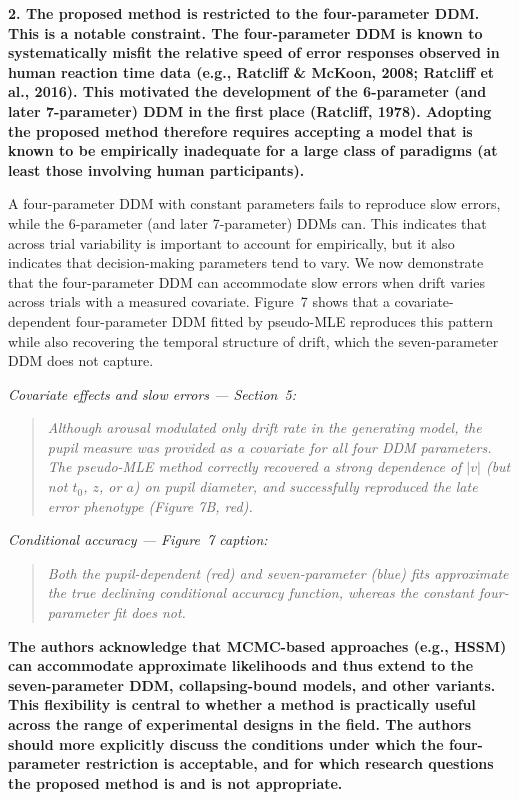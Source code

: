 \documentclass[00-main.tex]{subfiles}
\newcommand{\reviewercomment}[1]{\vspace{0.3cm}\textbf{#1}\vspace{0.15cm}}
\newcommand{\manuscriptquote}[1]{\begin{quote}\textit{#1}\end{quote}}
\begin{document}
\reviewercomment{2. The proposed method is restricted to the four-parameter DDM. This is a notable constraint. The four-parameter DDM is known to systematically misfit the relative speed of error responses observed in human reaction time data (e.g., Ratcliff \& McKoon, 2008; Ratcliff et al., 2016). This motivated the development of the 6-parameter (and later 7-parameter) DDM in the first place (Ratcliff, 1978). Adopting the proposed method therefore requires accepting a model that is known to be empirically inadequate for a large class of paradigms (at least those involving human participants).}

A four-parameter DDM with constant parameters fails to reproduce slow errors, while the 6-parameter (and later 7-parameter) DDMs can. This indicates that across trial variability is important to account for empirically, but it also indicates that decision-making parameters tend to vary. We now demonstrate that the four-parameter DDM can accommodate slow errors when drift varies across trials with a measured covariate. Figure~7 shows that a covariate-dependent four-parameter DDM fitted by pseudo-MLE reproduces this pattern while also recovering the temporal structure of drift, which the seven-parameter DDM does not capture.

\emph{Covariate effects and slow errors --- Section~5:}

\manuscriptquote{Although arousal modulated only drift rate in the generating model, the pupil measure was provided as a covariate for all four DDM parameters. The pseudo-MLE method correctly recovered a strong dependence of $|v|$ (but not $t_0$, $z$, or $a$) on pupil diameter, and successfully reproduced the late error phenotype (Figure 7B, red).}

\emph{Conditional accuracy --- Figure~7 caption:}

\manuscriptquote{Both the pupil-dependent (red) and seven-parameter (blue) fits approximate the true declining conditional accuracy function, whereas the constant four-parameter fit does not.}

\reviewercomment{The authors acknowledge that MCMC-based approaches (e.g., HSSM) can accommodate approximate likelihoods and thus extend to the seven-parameter DDM, collapsing-bound models, and other variants. This flexibility is central to whether a method is practically useful across the range of experimental designs in the field. The authors should more explicitly discuss the conditions under which the four-parameter restriction is acceptable, and for which research questions the proposed method is and is not appropriate.}
\end{document}
